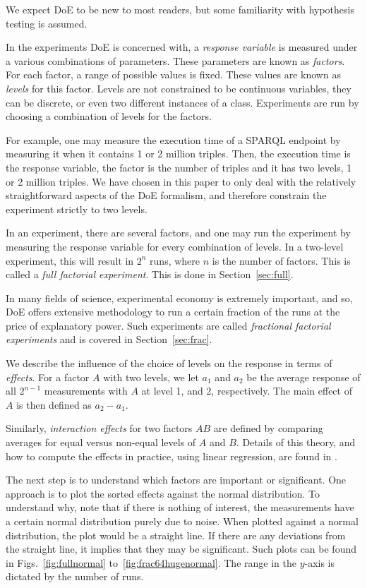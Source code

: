 \documentclass{llncs}
\begin{document}
We expect DoE to be new to most readers, but some familiarity with
hypothesis testing is assumed.

In the experiments DoE is concerned with, a \emph{response variable}
is measured under a various combinations of parameters.  These
parameters are known as \emph{factors}.  For each factor, a range of
possible values is fixed.  These values are known as \emph{levels} for
this factor.  Levels are not constrained to be continuous variables, they
can be discrete, or even two different instances of a class.
Experiments are run by choosing a combination of levels
for the factors.

For example, one may measure the execution time of a SPARQL endpoint
by measuring it when it contains 1 or 2 million triples.  Then, the
execution time is the response variable, the factor is the number of
triples and it has two levels, 1 or 2 million triples. We have chosen
in this paper to only deal with the relatively straightforward aspects
of the DoE formalism, and therefore constrain the experiment strictly
to two levels.

In an experiment, there are several factors, and one may run the
experiment by measuring the response variable for every combination of
levels. In a two-level experiment, this will result in $2^n$ runs,
where $n$ is the number of factors. This is called a \emph{full
  factorial experiment}. This is done in Section~\ref{sec:full}.

In many fields of science, experimental economy is extremely
important, and so, DoE offers extensive methodology to run a certain
fraction of the runs at the price of explanatory power. Such
experiments are called \emph{fractional factorial experiments} and is
covered in Section~\ref{sec:frac}.

We describe the influence of the choice of levels on the response in
terms of \emph{effects}.  For a factor $A$ with two levels, we let
$a_1$ and $a_2$ be the average response of all $2^{n-1}$ measurements
with $A$ at level 1, and 2, respectively.  The main effect of $A$ is
then defined as $a_2 - a_1$.

Similarly, \emph{interaction effects} for two factors $AB$ are defined
by comparing averages for equal versus non-equal levels of $A$ and
$B$.  Details of this theory, and how to compute the effects in
practice, using linear regression, are found in
\cite{wu2009experiments}.

The next step is to understand which factors are important or
significant.  One approach is to plot the sorted effects against the
normal distribution. To understand why, note that if there is nothing
of interest, the measurements have a certain normal distribution
purely due to noise. When plotted against a normal distribution, the
plot would be a straight line. If there are any deviations from the
straight line, it implies that they may be significant. Such plots can
be found in
Figs.~\ref{fig:fullnormal} to~\ref{fig:frac64hugenormal}. The
range in the $y$-axis is dictated by the number of runs.
\end{document}

